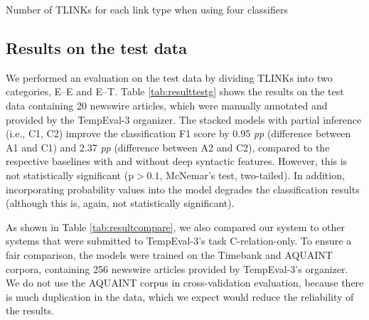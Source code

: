 \documentclass[english]{jnlp_1.4}
\begin{document}
\begin{table}[b]
\caption{Number of TLINKs for each link type when using four classifiers}
\label{tab:4c_num}

\end{table}

\begin{table}[b]
\label{tab:4c}

\end{table}


\subsection{Results on the test data}

We performed an evaluation on the test data by dividing TLINKs into two categories, E--E and E--T.
Table \ref{tab:resulttestg} shows the results on the test data containing 20 newswire articles, which were manually annotated and provided by the TempEval-3 organizer.
The stacked models with partial inference (i.e., C1, C2) improve the classification F1 score by 0.95 \textit{pp} (difference between A1 and C1) and 2.37 \textit{pp} (difference between A2 and C2), compared to the respective baselines with and without deep syntactic features. 
However, this is not statistically significant \mbox{($\mathrm{p} >0.1$}, \mbox{McNemar's} test, two-tailed). 
In addition, incorporating probability values into the model degrades the classification results (although this is, again, not statistically
significant).

\begin{table}[b]
\label{tab:resulttestg}

\end{table}

As shown in Table \ref{tab:resultcompare}, we also compared our system to other systems that were submitted to TempEval-3's task C-relation-only.
To ensure a fair comparison, the models were trained on the Timebank and AQUAINT corpora, containing 256 newswire articles provided by TempEval-3's organizer.
We do not use the AQUAINT corpus in cross-validation evaluation, because there is much duplication in the data, which we expect would reduce the reliability of the results.
\end{document}
